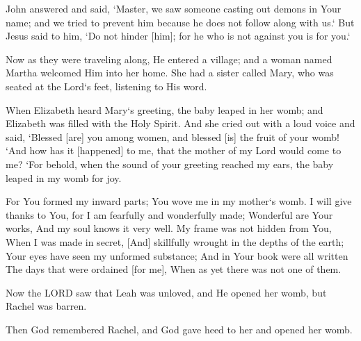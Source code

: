 \begin{scripture}[Luke 9:49-50]
    John answered and said, `Master, we saw someone casting out demons in Your name; and we tried to prevent him because he does not follow along with us.`
    But Jesus said to him, `Do not hinder [him]; for he who is not against you is for you.`
\end{scripture}

\begin{scripture}[Luke 10:38-39]
    Now as they were traveling along, He entered a village; and a woman named Martha welcomed Him into her home.
    She had a sister called Mary, who was seated at the Lord`s feet, listening to His word.
\end{scripture}

\begin{scripture}[Luke 1:41-44]
    When Elizabeth heard Mary`s greeting, the baby leaped in her womb; and Elizabeth was filled with the Holy Spirit.
    And she cried out with a loud voice and said, `Blessed [are] you among women, and blessed [is] the fruit of your womb!
    `And how has it [happened] to me, that the mother of my Lord would come to me?
    `For behold, when the sound of your greeting reached my ears, the baby leaped in my womb for joy.
\end{scripture}

\begin{scripture}[Psalm 139:13-16]
    For You formed my inward parts; You wove me in my mother`s womb.
    I will give thanks to You, for I am fearfully and wonderfully made; Wonderful are Your works, And my soul knows it very well.
    My frame was not hidden from You, When I was made in secret, [And] skillfully wrought in the depths of the earth;
    Your eyes have seen my unformed substance; And in Your book were all written The days that were ordained [for me], When as yet there was not one of them.
\end{scripture}

\begin{scripture}[Genesis 29:31]
    Now the LORD saw that Leah was unloved, and He opened her womb, but Rachel was barren.
\end{scripture}

\begin{scripture}[Genesis 30:22]
    Then God remembered Rachel, and God gave heed to her and opened her womb.
\end{scripture}


